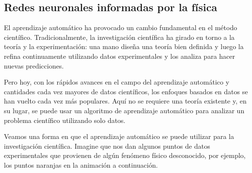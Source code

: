 




\subsection{Redes neuronales informadas por la física}
El aprendizaje automático ha provocado un cambio fundamental en el método científico. Tradicionalmente, la investigación científica ha girado en torno a la teoría y la experimentación: una mano diseña una teoría bien definida y luego la refina continuamente utilizando datos experimentales y los analiza para hacer nuevas predicciones.

Pero hoy, con los rápidos avances en el campo del aprendizaje automático y cantidades cada vez mayores de datos científicos, los enfoques basados en datos se han vuelto cada vez más populares. Aquí no se requiere una teoría existente y, en su lugar, se puede usar un algoritmo de aprendizaje automático para analizar un problema científico utilizando solo datos.

Veamos una forma en que el aprendizaje automático se puede utilizar para la investigación científica. Imagine que nos dan algunos puntos de datos experimentales que provienen de algún fenómeno físico desconocido, por ejemplo, los puntos naranjas en la animación a continuación.

